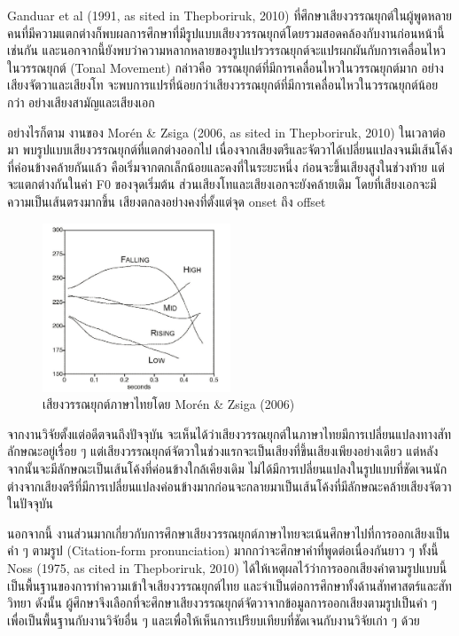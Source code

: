 \documentclass[a4paper]{article}
\begin{document}
    Ganduar et al (1991, as sited in Thepboriruk, 2010) ที่ศึกษาเสียงวรรณยุกต์ในผู้พูดหลายคนที่มีความแตกต่างก็พบผลการศึกษาที่มีรูปแบบเสียงวรรณยุกต์โดยรวมสอดคล้องกับงานก่อนหน้านี้เช่นกัน และนอกจากนี้ยังพบว่าความหลากหลายของรูปแปรวรรณยุกต์จะแปรผกผันกับการเคลื่อนไหวในวรรณยุกต์ (Tonal Movement) กล่าวคือ วรรณยุกต์ที่มีการเคลื่อนไหวในวรรณยุกต์มาก อย่างเสียงจัตวาและเสียงโท จะพบการแปรที่น้อยกว่าเสียงวรรณยุกต์ที่มีการเคลื่อนไหวในวรรณยุกต์น้อยกว่า อย่างเสียงสามัญและเสียงเอก

    อย่างไรก็ตาม งานของ Morén \& Zsiga (2006, as sited in Thepboriruk, 2010) ในเวลาต่อมา พบรูปแบบเสียงวรรณยุกต์ที่แตกต่างออกไป เนื่องจากเสียงตรีและจัตวาได้เปลี่ยนแปลงจนมีเส้นโค้งที่ค่อนข้างคล้ายกันแล้ว คือเริ่มจากตกเล็กน้อยและคงที่ในระยะหนึ่ง ก่อนจะขึ้นเสียงสูงในช่วงท้าย แต่จะแตกต่างกันในค่า F0 ของจุดเริ่มต้น ส่วนเสียงโทและเสียงเอกจะยังคล้ายเดิม โดยที่เสียงเอกจะมีความเป็นเส้นตรงมากขึ้น เสียงตกลงอย่างคงที่ตั้งแต่จุด onset ถึง offset
    \begin{figure}[!ht]
        \begin{center}
        \includegraphics[width=0.5\textwidth]{zsiga}
        \end{center}
        \caption{เสียงวรรณยุกต์ภาษาไทยโดย Morén \& Zsiga (2006)}
    \end{figure}

    จากงานวิจัยตั้งแต่อดีตจนถึงปัจจุบัน จะเห็นได้ว่าเสียงวรรณยุกต์ในภาษาไทยมีการเปลี่ยนแปลงทางสัทลักษณะอยู่เรื่อย ๆ แต่เสียงวรรณยุกต์จัตวาในช่วงแรกจะเป็นเสียงที่ขึ้นเสียงเพียงอย่างเดียว แต่หลังจากนั้นจะมีลักษณะเป็นเส้นโค้งที่ค่อนข้างใกล้เคียงเดิม ไม่ได้มีการเปลี่ยนแปลงในรูปแบบที่ชัดเจนนัก ต่างจากเสียงตรีที่มีการเปลี่ยนแปลงค่อนข้างมากก่อนจะกลายมาเป็นเส้นโค้งที่มีลักษณะคล้ายเสียงจัตวาในปัจจุบัน

    นอกจากนี้ งานส่วนมากเกี่ยวกับการศึกษาเสียงวรรณยุกต์ภาษาไทยจะเน้นศึกษาไปที่การออกเสียงเป็นคำ ๆ ตามรูป (Citation-form pronunciation) มากกว่าจะศึกษาคำที่พูดต่อเนื่องกันยาว ๆ ทั้งนี้ Noss (1975, as cited in Thepboriruk, 2010) ได้ให้เหตุผลไว้ว่าการออกเสียงคำตามรูปแบบนี้เป็นพื้นฐานของการทำความเข้าใจเสียงวรรณยุกต์ไทย และจำเป็นต่อการศึกษาทั้งด้านสัทศาสตร์และสัทวิทยา ดังนั้น ผู้ศึกษาจึงเลือกที่จะศึกษาเสียงวรรณยุกต์จัตวาจากข้อมูลการออกเสียงตามรูปเป็นคำ ๆ เพื่อเป็นพื้นฐานกับงานวิจัยอื่น ๆ และเพื่อให้เห็นการเปรียบเทียบที่ชัดเจนกับงานวิจัยเก่า ๆ ด้วย
\end{document}
